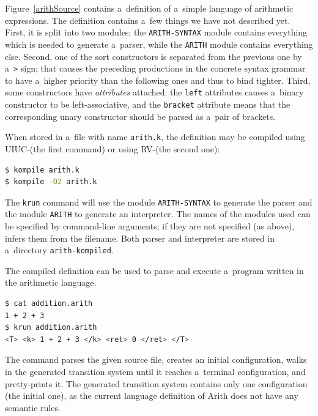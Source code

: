 \documentclass{fithesis3}
\newcommand{\krun}{\texttt{krun}\xspace}
\begin{document}
Figure~\ref{arithSource} contains a~definition of a~simple language of arithmetic expressions. The definition contains a~few things we have not described yet. First, it is split into two modules; the \texttt{ARITH-SYNTAX} module contains everything which is needed to generate a~parser, while the \texttt{ARITH} module contains everything else. Second, one of the sort constructors is separated from the previous one by a~\lstinline{>} sign; that causes the preceding productions in the concrete syntax grammar to have a~higher priority than the following ones and thus to bind tighter. Third, some constructors have \textit{attributes} attached; the \texttt{left} attributes causes a~binary constructor to be left-associative, and the \texttt{bracket} attribute means that the corresponding unary constructor should be parsed as a~pair of brackets.

When stored in a~file with name \texttt{arith.k}, the definition may be compiled using UIUC-\K (the first command) or using RV-\K (the second one):
\begin{lstlisting}[language=bash]
$ kompile arith.k
$ kompile -O2 arith.k
\end{lstlisting}
The \krun command will use the module \texttt{ARITH-SYNTAX} to generate the parser and the module \texttt{ARITH} to generate an interpreter. The names of the modules used can be specified by command-line arguments; if they are not specified (as above), \K infers them from the filename. Both parser and interpreter are stored in a~directory \texttt{arith-kompiled}.

The compiled definition can be used to parse and execute a~program written in the arithmetic language.
\begin{lstlisting}[language=bash]
$ cat addition.arith
1 + 2 + 3
$ krun addition.arith
<T> <k> 1 + 2 + 3 </k> <ret> 0 </ret> </T>
\end{lstlisting}
The command parses the given source file, creates an initial configuration, walks in the generated transition system until it reaches a~terminal configuration, and pretty-prints it. The generated transition system contains only one configuration (the initial one), as the current language definition of Arith does not have any semantic rules.
\end{document}
